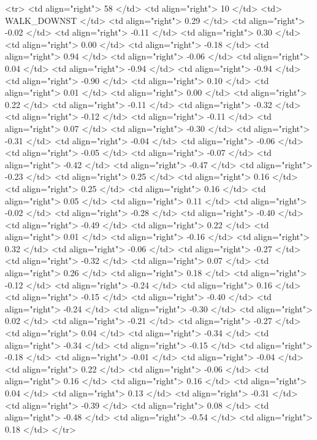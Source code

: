   <tr> <td align="right"> 58 </td> <td align="right">  10 </td> <td> WALK_DOWNST </td> <td align="right"> 0.29 </td> <td align="right"> -0.02 </td> <td align="right"> -0.11 </td> <td align="right"> 0.30 </td> <td align="right"> 0.00 </td> <td align="right"> -0.18 </td> <td align="right"> 0.94 </td> <td align="right"> -0.06 </td> <td align="right"> 0.04 </td> <td align="right"> -0.94 </td> <td align="right"> -0.94 </td> <td align="right"> -0.90 </td> <td align="right"> 0.10 </td> <td align="right"> 0.01 </td> <td align="right"> 0.00 </td> <td align="right"> 0.22 </td> <td align="right"> -0.11 </td> <td align="right"> -0.32 </td> <td align="right"> -0.12 </td> <td align="right"> -0.11 </td> <td align="right"> 0.07 </td> <td align="right"> -0.30 </td> <td align="right"> -0.31 </td> <td align="right"> -0.04 </td> <td align="right"> -0.06 </td> <td align="right"> -0.05 </td> <td align="right"> -0.07 </td> <td align="right"> -0.42 </td> <td align="right"> -0.47 </td> <td align="right"> -0.23 </td> <td align="right"> 0.25 </td> <td align="right"> 0.16 </td> <td align="right"> 0.25 </td> <td align="right"> 0.16 </td> <td align="right"> 0.05 </td> <td align="right"> 0.11 </td> <td align="right"> -0.02 </td> <td align="right"> -0.28 </td> <td align="right"> -0.40 </td> <td align="right"> -0.49 </td> <td align="right"> 0.22 </td> <td align="right"> 0.01 </td> <td align="right"> -0.16 </td> <td align="right"> 0.32 </td> <td align="right"> -0.06 </td> <td align="right"> -0.27 </td> <td align="right"> -0.32 </td> <td align="right"> 0.07 </td> <td align="right"> 0.26 </td> <td align="right"> 0.18 </td> <td align="right"> -0.12 </td> <td align="right"> -0.24 </td> <td align="right"> 0.16 </td> <td align="right"> -0.15 </td> <td align="right"> -0.40 </td> <td align="right"> -0.24 </td> <td align="right"> -0.30 </td> <td align="right"> 0.02 </td> <td align="right"> -0.21 </td> <td align="right"> -0.27 </td> <td align="right"> 0.04 </td> <td align="right"> -0.34 </td> <td align="right"> -0.34 </td> <td align="right"> -0.15 </td> <td align="right"> -0.18 </td> <td align="right"> -0.01 </td> <td align="right"> -0.04 </td> <td align="right"> 0.22 </td> <td align="right"> -0.06 </td> <td align="right"> 0.16 </td> <td align="right"> 0.16 </td> <td align="right"> 0.04 </td> <td align="right"> 0.13 </td> <td align="right"> -0.31 </td> <td align="right"> -0.39 </td> <td align="right"> 0.08 </td> <td align="right"> -0.48 </td> <td align="right"> -0.54 </td> <td align="right"> 0.18 </td> </tr>
